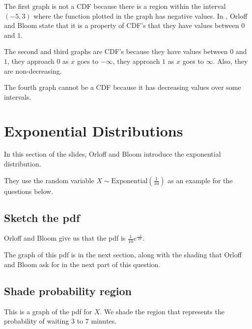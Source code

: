 \documentclass[a4paper,11pt]{article}
\begin{document}
The first graph is not a CDF because there is a region within the interval
$\left( -5, 3 \right)$ where the function plotted in the graph has negative
values.  In \cite{reading5b}, Orloff and Bloom state that it is
a property of CDF's that they have values between $0$ and $1$.

The second and third graphs are CDF's because they have values between $0$ and
$1$, they approach $0$ as $x$ goes to $-\infty$, they approach $1$ as $x$ goes
to $\infty$. Also, they are non-decreasing.

The fourth graph cannot be a CDF because it has decreasing values over some
intervals.



\section{Exponential Distributions}

In this section of the slides, Orloff and Bloom introduce the exponential
distribution.

They use the random variable
$X \sim \text{Exponential}\left( \frac{1}{10} \right)$ as an example
for the questions below.

\subsection{Sketch the pdf}

Orloff and Bloom give us that the pdf is $\frac{1}{10}e^{\frac{-x}{10}}$.

The graph of this pdf is in the next section, along with the shading that
Orloff and Bloom ask for in the next part of this question.

\subsection{Shade probability region}

This is a graph of the pdf for $X$.  We shade the region that represents
the probability of waiting $3$ to $7$ minutes.

\end{document}
